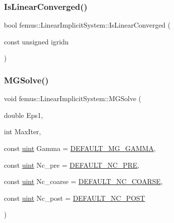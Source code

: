 \subsubsection{\texorpdfstring{Is\+Linear\+Converged()}{IsLinearConverged()}}
{\footnotesize\ttfamily bool femus\+::\+Linear\+Implicit\+System\+::\+Is\+Linear\+Converged (\begin{DoxyParamCaption}\item[{const unsigned}]{igridn }\end{DoxyParamCaption})}

\mbox{\label{classfemus_1_1_linear_implicit_system_a213ed6f52d201362753935f67e0ba30f}} 
\subsubsection{\texorpdfstring{M\+G\+Solve()}{MGSolve()}}
{\footnotesize\ttfamily void femus\+::\+Linear\+Implicit\+System\+::\+M\+G\+Solve (\begin{DoxyParamCaption}\item[{double}]{Eps1,  }\item[{int}]{Max\+Iter,  }\item[{const \mbox{\hyperlink{_typedefs_8hpp_a91ad9478d81a7aaf2593e8d9c3d06a14}{uint}}}]{Gamma = {\ttfamily \mbox{\hyperlink{_femus_default_8hpp_aa6458acc1fd5bf491e4121ebb5c115e1}{D\+E\+F\+A\+U\+L\+T\+\_\+\+M\+G\+\_\+\+G\+A\+M\+MA}}},  }\item[{const \mbox{\hyperlink{_typedefs_8hpp_a91ad9478d81a7aaf2593e8d9c3d06a14}{uint}}}]{Nc\+\_\+pre = {\ttfamily \mbox{\hyperlink{_femus_default_8hpp_a56e01beffdefa0f94bdf92f9bfc990f6}{D\+E\+F\+A\+U\+L\+T\+\_\+\+N\+C\+\_\+\+P\+RE}}},  }\item[{const \mbox{\hyperlink{_typedefs_8hpp_a91ad9478d81a7aaf2593e8d9c3d06a14}{uint}}}]{Nc\+\_\+coarse = {\ttfamily \mbox{\hyperlink{_femus_default_8hpp_a95a240c38b468754cc507c3597c90807}{D\+E\+F\+A\+U\+L\+T\+\_\+\+N\+C\+\_\+\+C\+O\+A\+R\+SE}}},  }\item[{const \mbox{\hyperlink{_typedefs_8hpp_a91ad9478d81a7aaf2593e8d9c3d06a14}{uint}}}]{Nc\+\_\+post = {\ttfamily \mbox{\hyperlink{_femus_default_8hpp_a0f88c327f74f1f82803c5a506d426b92}{D\+E\+F\+A\+U\+L\+T\+\_\+\+N\+C\+\_\+\+P\+O\+ST}}} }\end{DoxyParamCaption})}



